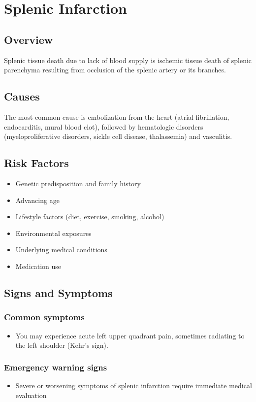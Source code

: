 \chapter{Splenic Infarction}
\label{sec:Splenic Infarction}

\section{Overview}
Splenic tissue death due to lack of blood supply is ischemic tissue death of splenic parenchyma resulting from occlusion of the splenic artery or its branches.
\section{Causes}
The most common cause is embolization from the heart (atrial fibrillation, endocarditis, mural blood clot), followed by hematologic disorders (myeloproliferative disorders, sickle cell disease, thalassemia) and vasculitis.     
\section{Risk Factors}

\begin{itemize}[noitemsep]
  \item Genetic predisposition and family history
  \item Advancing age
  \item Lifestyle factors (diet, exercise, smoking, alcohol)
  \item Environmental exposures
  \item Underlying medical conditions
  \item Medication use
\end{itemize}
\section{Signs and Symptoms}

\subsection{Common symptoms}
\begin{itemize}[noitemsep]
  \item You may experience acute left upper quadrant pain, sometimes radiating to the left shoulder (Kehr's sign). 
  \end{itemize}

\subsection{Emergency warning signs}
\begin{itemize}[noitemsep]
  \item Severe or worsening symptoms of splenic infarction require immediate medical evaluation
\end{itemize}
